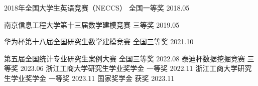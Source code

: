 



\begin{cvhonors}

  \cvhonor
    {2018年全国大学生英语竞赛（NECCS）} %
    {} %
    {全国一等奖} %
    {2018.05} %

  \cvhonor
    {南京信息工程大学第十三届数学建模竞赛} %
    {} %
    {三等奖} %
    {2019.05} %

\cvhonor
  {华为杯第十八届全国研究生数学建模竞赛} %
  {} %
  {全国三等奖} %
  {2021.10} %

  \cvhonor
    {第五届全国统计专业研究生案例大赛} %
    {} %
    {全国三等奖} %
    {2022.08} %
\cvhonor
  {泰迪杯数据挖掘竞赛} %
  {} %
  {三等奖} %
  {2023.06} 
\cvhonor
  {浙江工商大学研究生学业奖学金} %
  {} %
  {一等奖} %
  {2022.11} %
\cvhonor
  {浙江工商大学研究生学业奖学金} %
  {} %
  {一等奖} %
  {2023.11} 
\cvhonor
  {国家奖学金} %
  {} %
  {获奖} %
  {2023.11} 
\end{cvhonors}

